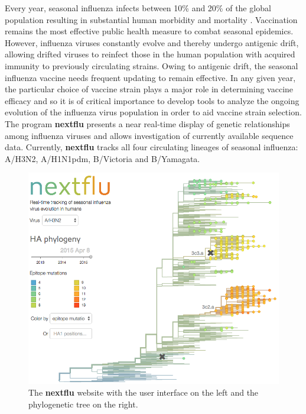 \documentclass{bioinfo}
\newcommand{\nextflu}{\textbf{nextflu}}
\begin{document}

Every year, seasonal influenza infects between 10\% and 20\% of the global population resulting in substantial human morbidity and mortality \citep{flufactsheet}.
Vaccination remains the most effective public health measure to combat seasonal epidemics.
However, influenza viruses constantly evolve and thereby undergo antigenic drift, allowing drifted viruses to reinfect those in the human population with acquired immunity to previously circulating strains.
Owing to antigenic drift, the seasonal influenza vaccine needs frequent updating to remain effective.
In any given year, the particular choice of vaccine strain plays a major role in determining vaccine efficacy and so it is of critical importance to develop tools to analyze the ongoing evolution of the influenza virus population in order to aid vaccine strain selection.
The program \nextflu{} presents a near real-time display of genetic relationships among influenza viruses and allows investigation of currently available sequence data.
Currently, \nextflu{} tracks all four circulating lineages of seasonal influenza: A/H3N2, A/H1N1pdm, B/Victoria and B/Yamagata.

\begin{figure}[t!]
	\centering
	\includegraphics[width=0.99\columnwidth]{tree}
	\caption[]{The \nextflu{} website with the user interface on the left and the phylogenetic tree on the right.}
	\label{fig:tree}
\end{figure}
\end{document}
